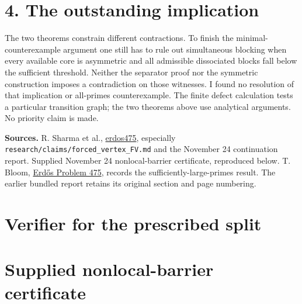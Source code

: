 \documentclass[11pt]{article}
\begin{document}
\section*{4. The outstanding implication}
The two theorems constrain different contractions. To finish the minimal-counterexample argument one still has to rule out simultaneous blocking when every available core is asymmetric and all admissible dissociated blocks fall below the sufficient threshold. Neither the separator proof nor the symmetric construction imposes a contradiction on those witnesses. I found no resolution of that implication or all-primes counterexample. The finite defect calculation tests a particular transition graph; the two theorems above use analytical arguments. No priority claim is made.

\textbf{Sources.} R. Sharma et al., \href{https://github.com/rosharma719/erdos475}{erdos475}, especially \texttt{research/claims/forced\_vertex\_FV.md} and the November 24 continuation report. Supplied November 24 nonlocal-barrier certificate, reproduced below. T. Bloom, \href{https://www.erdosproblems.com/475}{Erd\H os Problem 475}, records the sufficiently-large-primes result. The earlier bundled report retains its original section and page numbering.

\newpage\section*{Verifier for the prescribed split}
\newpage\section*{Supplied nonlocal-barrier certificate}
\end{document}
